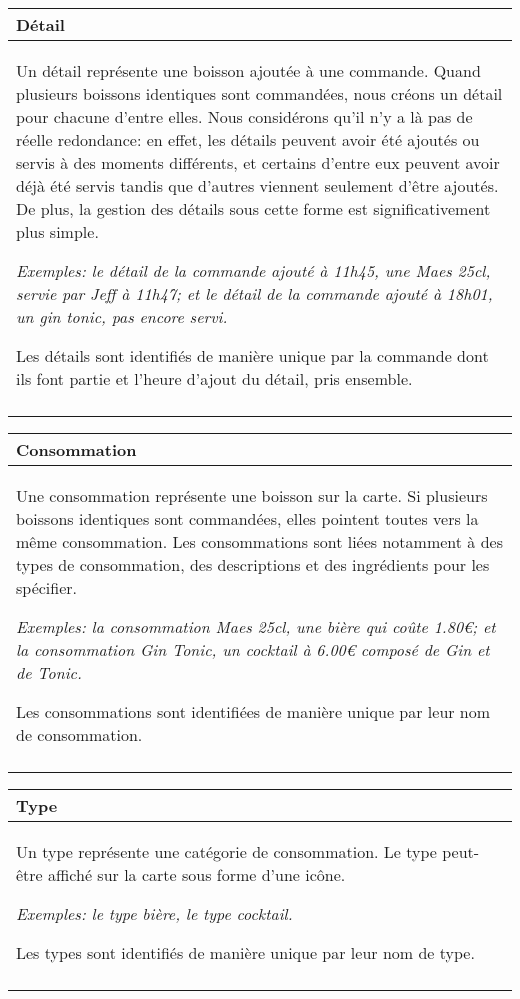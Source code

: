 \documentclass[a4paper,10pt]{article}
\begin{document}
\begin{tabu}{X}
\textbf{Détail} \\
\toprule

Un détail représente une boisson ajoutée à une commande. Quand plusieurs boissons identiques sont commandées, nous créons un détail pour chacune d'entre elles. Nous considérons qu'il n'y a là pas de réelle redondance: en effet, les détails peuvent avoir été ajoutés ou servis à des moments différents, et certains d'entre eux peuvent avoir déjà été servis tandis que d'autres viennent seulement d'être ajoutés. De plus, la gestion des détails sous cette forme est significativement plus simple.

\textsl{Exemples: le détail de la commande  ajouté à 11h45, une Maes 25cl, servie par Jeff à 11h47; et le détail de la commande  ajouté à 18h01, un gin tonic, pas encore servi.}

Les détails sont identifiés de manière unique par la commande dont ils font partie et l'heure d'ajout du détail, pris ensemble. \\\\
\end{tabu}

\begin{tabu}{X}
\textbf{Consommation} \\
\toprule

Une consommation représente une boisson sur la carte. Si plusieurs boissons identiques sont commandées, elles pointent toutes vers la même consommation. Les consommations sont liées notamment à des types de consommation, des descriptions et des ingrédients pour les spécifier.
    
\textsl{Exemples: la consommation Maes 25cl, une bière qui coûte 1.80€; et la consommation Gin Tonic, un cocktail à 6.00€ composé de Gin et de Tonic.}

Les consommations sont identifiées de manière unique par leur nom de consommation. \\\\
\end{tabu}

\begin{tabu}{X}
\textbf{Type} \\
\toprule

Un type représente une catégorie de consommation. Le type peut-être affiché sur la carte sous forme d'une icône.

\textsl{Exemples: le type bière, le type cocktail.}

Les types sont identifiés de manière unique par leur nom de type. \\\\
\end{tabu}
\end{document}
